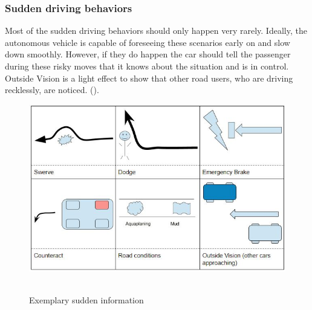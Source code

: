 \subsubsection{Sudden driving behaviors}
Most of the sudden driving behaviors should only happen very rarely. Ideally, the autonomous vehicle is capable of foreseeing these scenarios early on and slow down smoothly. However, if they do happen the car should tell the passenger during these risky moves that it knows about the situation and is in control. Outside Vision is a light effect to show that other road users, who are driving recklessly, are noticed. (\emph{}). 
\begin{figure}
    \includegraphics[width=1\textwidth]{fig/sudden.JPG}\hfill\
    \caption[Sudden Information]{Exemplary sudden information}
    \label{fig:sudden}
\end{figure}
